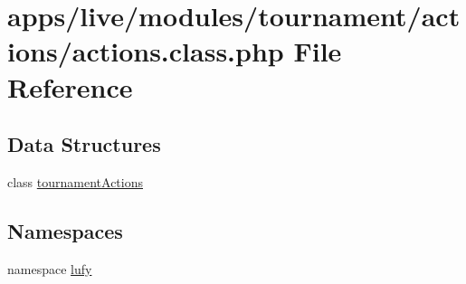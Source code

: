 \hypertarget{live_2modules_2tournament_2actions_2actions_8class_8php}{\section{apps/live/modules/tournament/actions/actions.class.\-php File Reference}
\label{live_2modules_2tournament_2actions_2actions_8class_8php}
}
\subsection*{Data Structures}
\begin{DoxyCompactItemize}
\item 
class \hyperlink{classtournament_actions}{tournament\-Actions}
\end{DoxyCompactItemize}
\subsection*{Namespaces}
\begin{DoxyCompactItemize}
\item 
namespace \hyperlink{namespacelufy}{lufy}
\end{DoxyCompactItemize}
